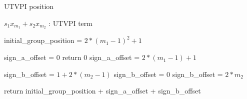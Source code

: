 \begin{algorithm}[!ht]
  \caption{UTVPI position}
  \linespread{\separationline}\selectfont
  \begin{algorithmic}[2]
     { $s_1 x_{m_1} + s_2 x_{m_2}$ : UTVPI term}

    \State initial\_group\_position = $2*(m_1 -1)^2 + 1$

    \State sign\_a\_offset = 0
    \Else
    \State return 0
    \Else
    \State sign\_a\_offset = $2*(m_1 - 1) + 1$
    \EndIf
    \EndIf
    \EndIf

    \State sign\_b\_offset = $1 + 2*(m_2 -1)$
    \Else
    \State sign\_b\_offset = 0
    \Else
    \State sign\_b\_offset = $2*m_2$
    \EndIf
    \EndIf
    \EndIf

    \State return initial\_group\_position + sign\_a\_offset + sign\_b\_offset

    \EndProcedure
  \end{algorithmic}

\end{algorithm}

